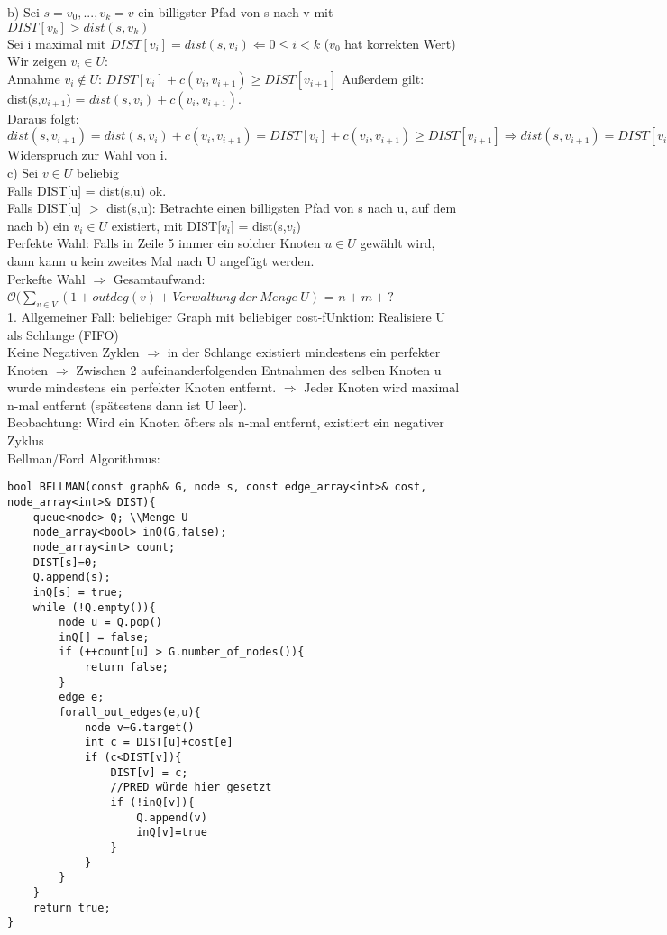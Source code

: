 \documentclass[a4paper]{article}
\newcommand{\oh}[1]{$\mathcal{O}(#1)$}
\begin{document}
b) Sei $s=v_0,...,v_k=v$ ein billigster Pfad von s nach v mit $DIST[v_k]>dist(s,v_k)$\\
Sei i maximal mit $DIST[v_i] = dist(s,v_i) \Leftarrow 0\leq i<k$ ($v_0$ hat korrekten Wert)\\
Wir zeigen $v_i\in U$:\\
Annahme $v_i \not\in U$: $DIST[v_i]+c(v_i,v_{i+1})\geq DIST[v_{i+1}]$ Außerdem gilt: dist(s,$v_{i+1}$) = $dist(s,v_i)+c(v_i,v_{i+1})$.\\
Daraus folgt: $dist(s,v_{i+1}) = dist(s,v_i)+c(v_i,v_{i+1}) = DIST[v_i]+c(v_i,v_{i+1}) \geq DIST[v_{i+1}]\Rightarrow dist(s,v_{i+1}) = DIST[v_{i+1}]$ Widerspruch zur Wahl von i.\\
c) Sei $v\in U$ beliebig\\
Falls DIST[u] = dist(s,u) ok.\\
Falls DIST[u] $>$ dist(s,u): Betrachte einen billigsten Pfad von s nach u, auf dem nach b) ein $v_i\in U $ existiert, mit DIST[$v_i$] = dist(s,$v_i$)\\
Perfekte Wahl: Falls in Zeile 5 immer ein solcher Knoten $u\in U$ gewählt wird, dann kann u kein zweites Mal nach U angefügt werden.\\
Perkefte Wahl $\Rightarrow$ Gesamtaufwand: \oh{\sum_{v\in V}(1+outdeg(v)+Verwaltung\ der\ Menge\ U} = $n+m+?$\\
1. Allgemeiner Fall: beliebiger Graph mit beliebiger cost-fUnktion: Realisiere U als Schlange (FIFO)\\
Keine Negativen Zyklen $\Rightarrow$ in der Schlange existiert mindestens ein perfekter Knoten $\Rightarrow$ Zwischen 2 aufeinanderfolgenden Entnahmen des selben Knoten u wurde mindestens ein perfekter Knoten entfernt. $\Rightarrow$ Jeder Knoten wird maximal n-mal entfernt (spätestens dann ist U leer).\\
Beobachtung: Wird ein Knoten öfters als n-mal entfernt, existiert ein negativer Zyklus\\
Bellman/Ford Algorithmus:
\begin{lstlisting}
bool BELLMAN(const graph& G, node s, const edge_array<int>& cost, node_array<int>& DIST){
	queue<node> Q; \\Menge U
	node_array<bool> inQ(G,false);
	node_array<int> count;
	DIST[s]=0;
	Q.append(s);
	inQ[s] = true;
	while (!Q.empty()){
		node u = Q.pop()
		inQ[] = false;
		if (++count[u] > G.number_of_nodes()){
			return false;
		}
		edge e;
		forall_out_edges(e,u){
			node v=G.target()
			int c = DIST[u]+cost[e]
			if (c<DIST[v]){
				DIST[v] = c; 
				//PRED würde hier gesetzt
				if (!inQ[v]){
					Q.append(v)
					inQ[v]=true
				}
			}
		}
	}
	return true;
}
\end{lstlisting}
\end{document}

